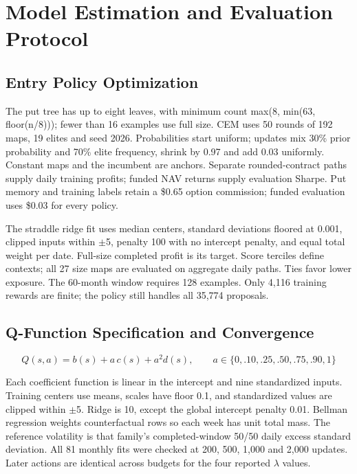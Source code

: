 \clearpage

\section{Model Estimation and Evaluation Protocol}\label{app:b}

\subsection*{Entry Policy Optimization}

The put tree has up to eight leaves, with minimum count max(8, min(63, floor(n/8))); fewer than 16 examples use full size. CEM uses 50 rounds of 192 maps, 19 elites and seed 2026. Probabilities start uniform; updates mix 30\% prior probability and 70\% elite frequency, shrink by 0.97 and add 0.03 uniformly. Constant maps and the incumbent are anchors. Separate rounded-contract paths supply daily training profits; funded NAV returns supply evaluation Sharpe. Put memory and training labels retain a \$0.65 option commission; funded evaluation uses \$0.03 for every policy.


The straddle ridge fit uses median centers, standard deviations floored at 0.001, clipped inputs within \(\pm\)5, penalty 100 with no intercept penalty, and equal total weight per date. Full-size completed profit is its target. Score terciles define contexts; all 27 size maps are evaluated on aggregate daily paths. Ties favor lower exposure. The 60-month window requires 128 examples. Only 4,116 training rewards are finite; the policy still handles all 35,774 proposals.


\subsection*{Q-Function Specification and Convergence}

\begin{equation*}Q(s,a)=b(s)+a\,c(s)+a^2d(s),\qquad a\in\{0,.10,.25,.50,.75,.90,1\}\end{equation*}

Each coefficient function is linear in the intercept and nine standardized inputs. Training centers use means, scales have floor 0.1, and standardized values are clipped within \(\pm\)5. Ridge is 10, except the global intercept penalty 0.01. Bellman regression weights counterfactual rows so each week has unit total mass. The reference volatility is that family's completed-window 50/50 daily excess standard deviation. All 81 monthly fits were checked at 200, 500, 1,000 and 2,000 updates. Later actions are identical across budgets for the four reported \(\lambda\) values.


